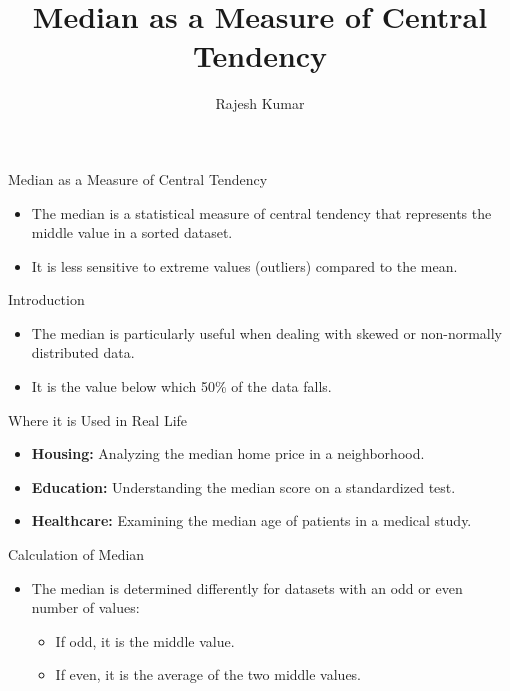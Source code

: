 \title{Median as a Measure of Central Tendency}
\author{Rajesh Kumar}
\date{}

\begin{frame}
  \titlepage
\end{frame}

\begin{frame}{Median as a Measure of Central Tendency}
  \begin{itemize}
    \item The median is a statistical measure of central tendency that represents the middle value in a sorted dataset.
    \item It is less sensitive to extreme values (outliers) compared to the mean.
  \end{itemize}
\end{frame}

\begin{frame}{Introduction}
  \begin{itemize}
    \item The median is particularly useful when dealing with skewed or non-normally distributed data.
    \item It is the value below which 50\% of the data falls.
  \end{itemize}
\end{frame}

\begin{frame}{Where it is Used in Real Life}
  \begin{itemize}
    \item \textbf{Housing:} Analyzing the median home price in a neighborhood.
    \item \textbf{Education:} Understanding the median score on a standardized test.
    \item \textbf{Healthcare:} Examining the median age of patients in a medical study.
  \end{itemize}
\end{frame}

\begin{frame}{Calculation of Median}
  \begin{itemize}
    \item The median is determined differently for datasets with an odd or even number of values:
    \begin{itemize}
      \item If odd, it is the middle value.
      \item If even, it is the average of the two middle values.
    \end{itemize}
  \end{itemize}
\end{frame}

